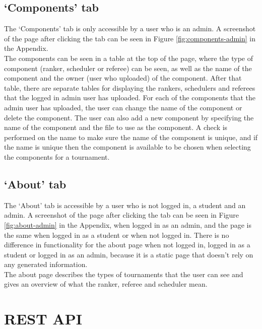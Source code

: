 \documentclass[a4paper, 11pt]{report}
\begin{document}
\subsection{`Components' tab}
\label{sec:impl-tab-components}

The `Components' tab is only accessible by a user who is an admin. A screenshot
of the page after clicking the tab can be seen in Figure \ref{fig:components-admin}
in the Appendix. \\

The components can be seen in a table at the top of the page, where the type of
component (ranker, scheduler or referee) can be seen, as well as the name of the
component and the owner (user who uploaded) of the component. After that table,
there are separate tables for displaying the rankers, schedulers and referees
that the logged in admin user has uploaded. For each of the components that the
admin user has uploaded, the user can change the name of the component or delete
the component. The user can also add a new component by specifying the name of the
component and the file to use as the component. A check is performed on the name
to make sure the name of the component is unique, and if the name is unique then
the component is available to be chosen when selecting the components for a
tournament.

\subsection{`About' tab}
\label{sec:impl-tab-about}

The `About' tab is accessible by a user who is not logged in, a student
and an admin. A screenshot of the page after clicking the tab can be seen in
Figure \ref{fig:about-admin} in the Appendix, when logged in as an admin,
and the page is the same when logged in as a student or when not logged in.
There is no difference in functionality for the about page when not logged in,
logged in as a student or logged in as an admin, because it is a static page
that doesn't rely on any generated information. \\

The about page describes the types of tournaments that the user can see and
gives an overview of what the ranker, referee and scheduler mean.

\section{REST API}
\end{document}

